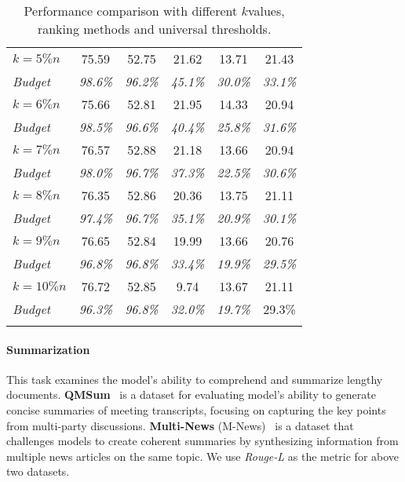 \begin{table}[!t]
{\begin{tabular}{lccccc}
$k=5\%n$  &    75.59   &   52.75    &   21.62     &   13.71      &    21.43   \\
\textit{Budget}    &   \textit{98.6\%}   &   \textit{96.2\%}    &    \textit{45.1\%}    &  \textit{30.0\%}       &     \textit{33.1\%}  \\
$k=6\% n$  &  75.66     & 52.81      &   21.95     &    14.33       &   20.94    \\
\textit{Budget}    &    \textit{98.5\%}   &    \textit{96.6\%}   &   \textit{40.4\%}    &  \textit{25.8\%}       &  \textit{31.6\%}    \\
$k=7\% n$  &  76.57     & 52.88      &   21.18     &    13.66     &   20.94    \\
\textit{Budget}    &    \textit{98.0\%}   &    \textit{96.7\%}   &   \textit{37.3\%}    &  \textit{22.5\%}       &  \textit{30.6\%}    \\
$k=8\% n$  &  76.35     & 52.86      &   20.36     &    13.75     &   21.11    \\
\textit{Budget}    &    \textit{97.4\%}   &    \textit{96.7\%}   &   \textit{35.1\%}    &  \textit{20.9\%}       &  \textit{30.1\%}    \\
$k=9\% n$  &  76.65     & 52.84      &   19.99     &    13.66     &   20.76    \\
\textit{Budget}    &    \textit{96.8\%}   &    \textit{96.8\%}   &   \textit{33.4\%}    &  \textit{19.9\%}       &  \textit{29.5\%}    \\
$k=10\%n$   &  76.72     &  52.85     &     9.74   &  13.67       &   21.11    \\
\textit{Budget}    &  \textit{96.3\%}     &  \textit{96.8\%}    &   \textit{32.0\%}     &   \textit{19.7\%}      &   29.3\%    \\
\arrayrulecolor{black}\bottomrule[1.3pt]
\end{tabular}
}
\caption{Performance comparison with different $k$values, ranking methods and universal thresholds.\label{extend_ablation}}
\end{table}


\paragraph{Summarization} This task examines the model's ability to comprehend and summarize lengthy documents. \textbf{QMSum}~\cite{DBLP:conf/naacl/ZhongYYZMJACLQR21} is a dataset for evaluating model's ability to generate concise summaries of meeting transcripts, focusing on capturing the key points from multi-party discussions. \textbf{Multi-News} (M-News)~\cite{DBLP:conf/acl/FabbriLSLR19} is a dataset that challenges models to create coherent summaries by synthesizing information from multiple news articles on the same topic. We use \textit{Rouge-L} as the metric for above two datasets.


